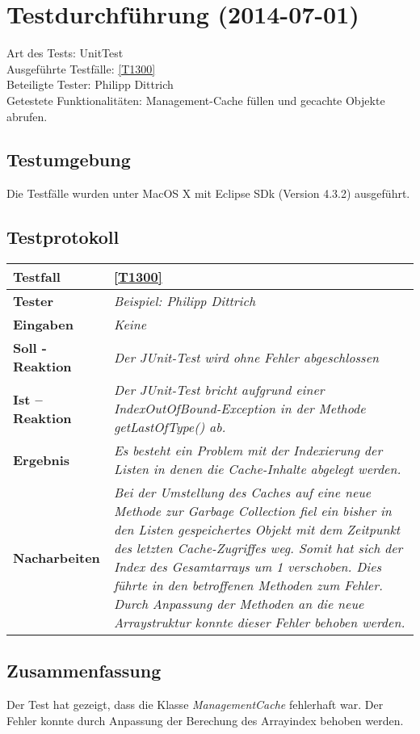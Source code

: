 
\chapter{Testdurchführung (2014-07-01)}

Art des Tests: UnitTest\\
Ausgeführte Testfälle: \ref{T1300}\\ 
Beteiligte Tester: Philipp Dittrich\\
Getestete Funktionalitäten: Management-Cache füllen und gecachte Objekte
abrufen.

\section{Testumgebung}

Die Testfälle wurden unter MacOS X mit Eclipse SDk (Version 4.3.2) ausgeführt.

\section{Testprotokoll}

\begin{longtable}{|p{4cm}|p{11cm}|}
\hline
\textbf{Testfall} & \ref{T1300} \\
\hline
\textbf{Tester} & \textit{Beispiel: Philipp Dittrich} \\
\hline
\textbf{Eingaben} & \textit{Keine} \\
\hline
\textbf{Soll - Reaktion} & \textit{Der JUnit-Test wird ohne Fehler
abgeschlossen }
\\
\hline
\textbf{Ist -- Reaktion} & \textit{Der JUnit-Test bricht aufgrund einer
IndexOutOfBound-Exception in der Methode getLastOfType() ab.}
\\
\hline
\textbf{Ergebnis} & \textit{Es besteht ein Problem mit der Indexierung der
Listen in denen die Cache-Inhalte abgelegt werden.}
\\
\hline
\textbf{Nacharbeiten } & \textit{Bei der Umstellung des Caches auf eine neue
Methode zur Garbage Collection fiel ein bisher in den Listen gespeichertes
Objekt mit dem Zeitpunkt des letzten Cache-Zugriffes weg. Somit hat sich der
Index des Gesamtarrays um 1 verschoben. Dies führte in den betroffenen Methoden
zum Fehler. Durch Anpassung der Methoden an die neue Arraystruktur konnte
dieser Fehler behoben werden.}
\\
\hline
\end{longtable}

\section{Zusammenfassung}

Der Test hat gezeigt, dass die Klasse \textit{ManagementCache} fehlerhaft war.
Der Fehler konnte durch Anpassung der Berechung des Arrayindex behoben werden.
